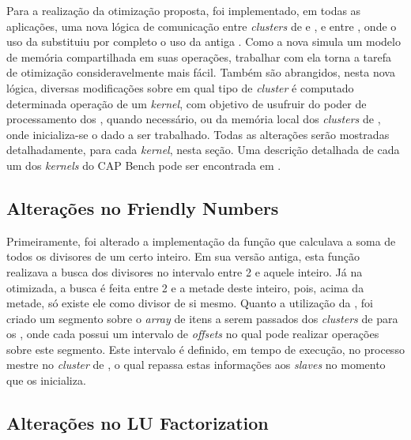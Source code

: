 \documentclass[a4paper,11pt]{article}
\newcommand{\capb}{CAP Bench\xspace}
\begin{document}
Para a realização da otimização proposta, foi implementado, em todas as aplicações, uma nova lógica de comunicação entre \textit{clusters} de \io e \ccs, e entre \ccs, onde o uso da \async substituiu por completo o uso da antiga \ipc. Como a nova \api simula um modelo de memória compartilhada em suas operações, trabalhar com ela torna a tarefa de otimização consideravelmente mais fácil. Também são abrangidos, nesta nova lógica, diversas modificações sobre em qual tipo de \textit{cluster} é computado determinada operação de um \textit{kernel}, com objetivo de usufruir do poder de processamento dos \ccs, quando necessário, ou da memória local dos \textit{clusters} de \io, onde inicializa-se o dado a ser trabalhado. Todas as alterações serão mostradas detalhadamente, para cada \textit{kernel}, nesta seção. Uma descrição detalhada de cada um dos \textit{kernels} do \capb pode ser encontrada em \cite{Castro-Souza-CCPE:2016}.

\subsection{Alterações no Friendly Numbers}

Primeiramente, foi alterado a implementação da função que calculava a soma de todos os divisores de um certo inteiro. Em sua versão antiga, esta função realizava a busca dos divisores no intervalo entre 2 e aquele inteiro. Já na otimizada, a busca é feita entre 2 e a metade deste inteiro, pois, acima da metade, só existe ele como divisor de si mesmo. Quanto a utilização da \async, foi criado um segmento sobre o \textit{array} de itens a serem passados dos \textit{clusters} de \io para os \ccs, onde cada \cc possui um intervalo de \textit{offsets} no qual pode realizar operações sobre este segmento. Este intervalo é definido, em tempo de execução, no processo mestre no \textit{cluster} de \io, o qual repassa estas informações aos \textit{slaves} no momento que os inicializa.

\subsection{Alterações no LU Factorization}
\end{document}
